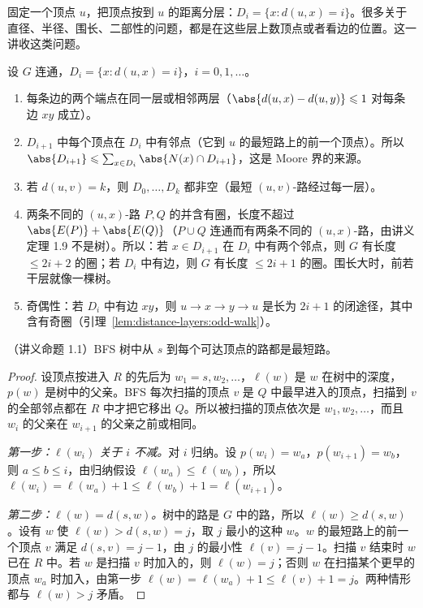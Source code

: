 \label{lec:distance-layers}

固定一个顶点 $u$，把顶点按到 $u$ 的距离分层：$D_i=\{x: d(u,x)=i\}$。很多关于直径、半径、围长、二部性的问题，都是在这些层上数顶点或者看边的位置。这一讲收这类问题。


设 $G$ 连通，$D_i=\{x:d(u,x)=i\}$，$i=0,1,\dots$。
\begin{enumerate}
\item 每条边的两个端点在同一层或相邻两层（$\abs{d(u,x)-d(u,y)}\leqslant1$ 对每条边 $xy$ 成立）。
\item $D_{i+1}$ 中每个顶点在 $D_i$ 中有邻点（它到 $u$ 的最短路上的前一个顶点）。所以 $\abs{D_{i+1}}\leqslant\sum_{x\in D_i}\abs{N(x)\cap D_{i+1}}$，这是 Moore 界的来源。
\item 若 $d(u,v)=k$，则 $D_0,\dots,D_k$ 都非空（最短 $(u,v)$-路经过每一层）。
\item 两条不同的 $(u,x)$-路 $P,Q$ 的并含有圈，长度不超过 $\abs{E(P)}+\abs{E(Q)}$（$P\cup Q$ 连通而有两条不同的 $(u,x)$-路，由讲义定理 1.9 不是树）。所以：若 $x\in D_{i+1}$ 在 $D_i$ 中有两个邻点，则 $G$ 有长度 $\leqslant2i+2$ 的圈；若 $D_i$ 中有边，则 $G$ 有长度 $\leqslant2i+1$ 的圈。围长大时，前若干层就像一棵树。
\item 奇偶性：若 $D_i$ 中有边 $xy$，则 $u\to x\to y\to u$ 是长为 $2i+1$ 的闭途径，其中含有奇圈（引理~\ref{lem:distance-layers:odd-walk}）。
\end{enumerate}

\begin{proposition}\label{prop:distance-layers:bfs}
（讲义命题 1.1）BFS 树中从 $s$ 到每个可达顶点的路都是最短路。
\end{proposition}
\begin{proof}
设顶点按进入 $R$ 的先后为 $w_1=s,w_2,\dots$，$\ell(w)$ 是 $w$ 在树中的深度，$p(w)$ 是树中的父亲。BFS 每次扫描的顶点 $v$ 是 $Q$ 中最早进入的顶点，扫描到 $v$ 的全部邻点都在 $R$ 中才把它移出 $Q$。所以被扫描的顶点依次是 $w_1,w_2,\dots$，而且 $w_i$ 的父亲在 $w_{i+1}$ 的父亲之前或相同。

\emph{第一步：$\ell(w_i)$ 关于 $i$ 不减。}对 $i$ 归纳。设 $p(w_i)=w_a$，$p(w_{i+1})=w_b$，则 $a\leqslant b\leqslant i$，由归纳假设 $\ell(w_a)\leqslant\ell(w_b)$，所以 $\ell(w_i)=\ell(w_a)+1\leqslant\ell(w_b)+1=\ell(w_{i+1})$。

\emph{第二步：$\ell(w)=d(s,w)$。}树中的路是 $G$ 中的路，所以 $\ell(w)\geqslant d(s,w)$。设有 $w$ 使 $\ell(w)>d(s,w)=j$，取 $j$ 最小的这种 $w$。$w$ 的最短路上的前一个顶点 $v$ 满足 $d(s,v)=j-1$，由 $j$ 的最小性 $\ell(v)=j-1$。扫描 $v$ 结束时 $w$ 已在 $R$ 中。若 $w$ 是扫描 $v$ 时加入的，则 $\ell(w)=j$；否则 $w$ 在扫描某个更早的顶点 $w_a$ 时加入，由第一步 $\ell(w)=\ell(w_a)+1\leqslant\ell(v)+1=j$。两种情形都与 $\ell(w)>j$ 矛盾。
\end{proof}

